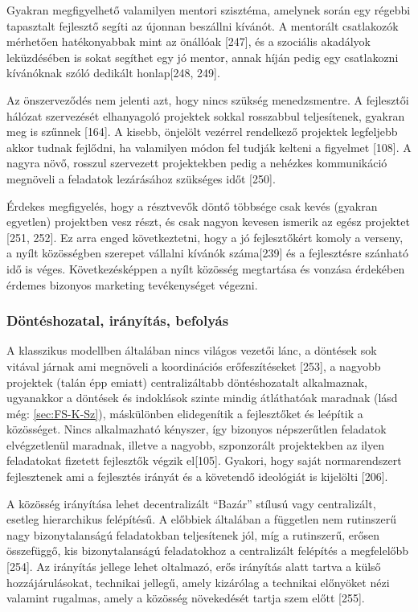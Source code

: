 \documentclass[12pt,magyar,a4paper,oneside]{scrreprt}
\begin{document}
Gyakran megfigyelhető valamilyen mentori szisztéma, amelynek során egy
régebbi tapasztalt fejlesztő segíti az újonnan beszállni kívánót. A
mentorált csatlakozók mérhetően hatékonyabbak mint az önállóak
{[}247{]}, és a szociális akadályok leküzdésében is sokat segíthet egy
jó mentor, annak híján pedig egy csatlakozni kívánóknak szóló dedikált
honlap{[}248, 249{]}.

Az önszerveződés nem jelenti azt, hogy nincs szükség menedzsmentre. A
fejlesztői hálózat szervezését elhanyagoló projektek sokkal rosszabbul
teljesítenek, gyakran meg is szűnnek {[}164{]}. A kisebb, önjelölt
vezérrel rendelkező projektek legfeljebb akkor tudnak fejlődni, ha
valamilyen módon fel tudják kelteni a figyelmet {[}108{]}. A nagyra
növő, rosszul szervezett projektekben pedig a nehézkes kommunikáció
megnöveli a feladatok lezárásához szükséges időt {[}250{]}.

Érdekes megfigyelés, hogy a résztvevők döntő többsége csak kevés
(gyakran egyetlen) projektben vesz részt, és csak nagyon kevesen ismerik
az egész projektet {[}251, 252{]}. Ez arra enged következtetni, hogy a
jó fejlesztőkért komoly a verseny, a nyílt közösségben szerepet vállalni
kívánók száma{[}239{]} és a fejlesztésre szánható idő is véges.
Következésképpen a nyílt közösség megtartása és vonzása érdekében
érdemes bizonyos marketing tevékenységet végezni.

\hypertarget{duxf6ntuxe9shozatal-iruxe1nyuxedtuxe1s-befolyuxe1s}{%
\subsubsection{Döntéshozatal, irányítás,
befolyás}\label{duxf6ntuxe9shozatal-iruxe1nyuxedtuxe1s-befolyuxe1s}}

A klasszikus modellben általában nincs világos vezetői lánc, a döntések
sok vitával járnak ami megnöveli a koordinációs erőfeszítéseket
{[}253{]}, a nagyobb projektek (talán épp emiatt) centralizáltabb
döntéshozatalt alkalmaznak, ugyanakkor a döntések és indoklások szinte
mindig átláthatóak maradnak (lásd még: \ref{sec:FS-K-Sz}), máskülönben
elidegenítik a fejlesztőket és leépítik a közösséget. Nincs alkalmazható
kényszer, így bizonyos népszerűtlen feladatok elvégzetlenül maradnak,
illetve a nagyobb, szponzorált projektekben az ilyen feladatokat
fizetett fejlesztők végzik el{[}105{]}. Gyakori, hogy saját
normarendszert fejlesztenek ami a fejlesztés irányát és a követendő
ideológiát is kijelölti {[}206{]}.

A közösség irányítása lehet decentralizált ``Bazár'' stílusú vagy
centralizált, esetleg hierarchikus felépítésű. A előbbiek általában a
független nem rutinszerű nagy bizonytalanságú feladatokban teljesítenek
jól, míg a rutinszerű, erősen összefüggő, kis bizonytalanságú
feladatokhoz a centralizált felépítés a megfelelőbb {[}254{]}. Az
irányítás jellege lehet oltalmazó, erős irányítás alatt tartva a külső
hozzájárulásokat, technikai jellegű, amely kizárólag a technikai
előnyöket nézi valamint rugalmas, amely a közösség növekedését tartja
szem előtt {[}255{]}.
\end{document}
